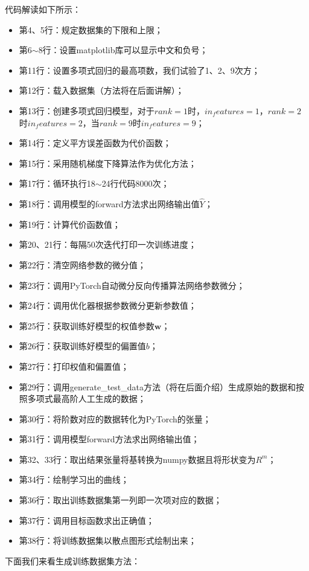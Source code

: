 \documentclass[UTF8]{article}
\begin{document}
代码解读如下所示：
\begin{itemize}
\item 第4、5行：规定数据集的下限和上限；
\item 第6$\sim$8行：设置matplotlib库可以显示中文和负号；
\item 第11行：设置多项式回归的最高项数，我们试验了1、2、9次方；
\item 第12行：载入数据集（方法将在后面讲解）；
\item 第13行：创建多项式回归模型，对于$rank=1$时，$in_features=1$，$rank=2$时$in_features=2$，当$rank=9$时$in_features=9$；
\item 第14行：定义平方误差函数为代价函数；
\item 第15行：采用随机梯度下降算法作为优化方法；
\item 第17行：循环执行18$\sim$24行代码8000次；
\item 第18行：调用模型的forward方法求出网络输出值$\hat{Y}$；
\item 第19行：计算代价函数值；
\item 第20、21行：每隔50次迭代打印一次训练进度；
\item 第22行：清空网络参数的微分值；
\item 第23行：调用PyTorch自动微分反向传播算法网络参数微分；
\item 第24行：调用优化器根据参数微分更新参数值；
\item 第25行：获取训练好模型的权值参数$\boldsymbol{w}$；
\item 第26行：获取训练好模型的偏置值$b$；
\item 第27行：打印权值和偏置值；
\item 第29行：调用generate\_test\_data方法（将在后面介绍）生成原始的数据和按照多项式最高阶人工生成的数据；
\item 第30行：将阶数对应的数据转化为PyTorch的张量；
\item 第31行：调用模型forward方法求出网络输出值；
\item 第32、33行：取出结果张量将基转换为numpy数据且将形状变为$R^{m}$；
\item 第34行：绘制学习出的曲线；
\item 第36行：取出训练数据集第一列即一次项对应的数据；
\item 第37行：调用目标函数求出正确值；
\item 第38行：将训练数据集以散点图形式绘制出来；
\end{itemize}
下面我们来看生成训练数据集方法：
\end{document}
